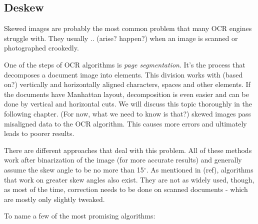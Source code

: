 \subsection{Deskew}

Skewed images are probably the most common problem that many OCR engines struggle with. They usually .. (arise? happen?) when an image is scanned or photographed crookedly. 

One of the steps of OCR algorithms is \emph{page segmentation}. It's the process that decomposes a document image into elements. This division works with (based on?) vertically and horizontally aligned characters, spaces and other elements. If the documents have Manhattan layout, decomposition is even easier and can be done by vertical and horizontal cuts. We will discuss this topic thoroughly in the following chapter. (For now, what we need to know is that?) skewed images pass misaligned data to the OCR algorithm. This causes more errors and ultimately leads to poorer results.

There are different approaches that deal with this problem. All of these methods work after binarization of the image (for more accurate results) and generally assume the skew angle to be no more than 15$^{\circ}$. As mentioned in (ref), algorithms that work on greater skew angles also exist. They are not as widely used, though, as most of the time, correction needs to be done on scanned documents - which are mostly only slightly tweaked.

To name a few of the most promising algorithms:

